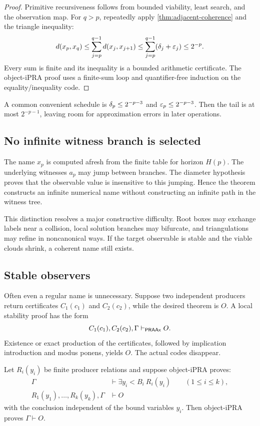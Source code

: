 \begin{proof}
Primitive recursiveness follows from bounded viability, least search, and the observation map.  For \(q>p\), repeatedly apply \cref{thm:adjacent-coherence} and the triangle inequality:
\[
 d(x_p,x_q)
 \le\sum_{j=p}^{q-1}d(x_j,x_{j+1})
 \le\sum_{j=p}^{q-1}(\delta_j+\varepsilon_j)
 \le 2^{-p}.
\]
Every sum is finite and its inequality is a bounded arithmetic certificate.  The object-iPRA proof uses a finite-sum loop and quantifier-free induction on the equality/inequality code.
\end{proof}

A common convenient schedule is \(\delta_p\le 2^{-p-3}\) and \(\varepsilon_p\le 2^{-p-3}\).  Then the tail is at most \(2^{-p-1}\), leaving room for approximation errors in later operations.

\subsection{No infinite witness branch is selected}

The name \(x_p\) is computed afresh from the finite table for horizon \(H(p)\).  The underlying witnesses \(a_p\) may jump between branches.  The diameter hypothesis proves that the observable value is insensitive to this jumping.  Hence the theorem constructs an infinite numerical name without constructing an infinite path in the witness tree.

This distinction resolves a major constructive difficulty.  Root boxes may exchange labels near a collision, local solution branches may bifurcate, and triangulations may refine in noncanonical ways.  If the target observable is stable and the viable clouds shrink, a coherent name still exists.

\subsection{Stable observers}

Often even a regular name is unnecessary.  Suppose two independent producers return certificates \(C_1(c_1)\) and \(C_2(c_2)\), while the desired theorem is \(O\).  A local stability proof has the form
\[
 C_1(c_1),C_2(c_2),\Gamma\vdash_{\mathsf{PRAAx}}O.
\]
Existence or exact production of the certificates, followed by implication introduction and modus ponens, yields \(O\).  The actual codes disappear.

\begin{theorem}
\label{thm:stable-erasure}
Let \(R_i(y_i)\) be finite producer relations and suppose object-iPRA proves:
\begin{align*}
 \Gamma&\vdash\exists y_i<B_i\ R_i(y_i)\qquad(1\le i\le k),\\
 R_1(y_1),\ldots,R_k(y_k),\Gamma&\vdash O
\end{align*}
with the conclusion independent of the bound variables \(y_i\).  Then object-iPRA proves \(\Gamma\vdash O\).
\end{theorem}


